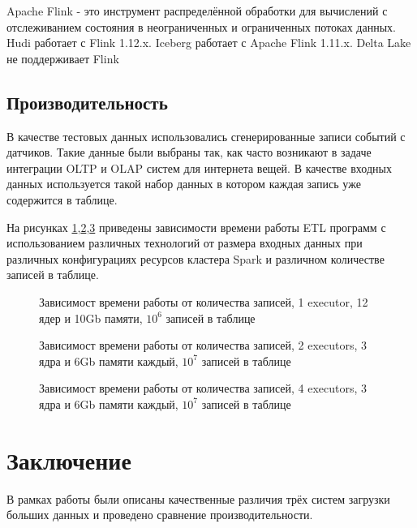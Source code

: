 \documentclass[%
bachelor,    %
subf,        %
href,        %
colorlinks,  %
]{disser}
\begin{document}
Apache Flink - это инструмент распределённой обработки для вычислений с отслеживанием состояния в неограниченных и ограниченных потоках данных.\cite{flink}
Hudi работает с Flink 1.12.x. Iceberg работает с Apache Flink 1.11.x. Delta Lake не поддерживает Flink




\subsection{Производительность}
В качестве тестовых данных использовались сгенерированные записи событий с датчиков. Такие данные были выбраны так, как часто возникают в задаче интеграции OLTP и OLAP систем для интернета вещей.\cite{test_data}\cite{iot_case1}\cite{iot_case2} В качестве входных данных используется такой набор данных в котором каждая запись уже содержится в таблице.

На рисунках \ref{fig:1},\ref{fig:2},\ref{fig:3} приведены зависимости времени работы ETL программ с использованием различных технологий от размера входных данных при различных конфигурациях ресурсов кластера Spark и различном количестве записей в таблице.

\begin{figure}
	
	\caption{Зависимост времени работы от количества записей, 1 executor, 12 ядер и 10Gb памяти, $10^6$ записей в таблице}
	\label{fig:1}
\end{figure}
\begin{figure}
	
	\caption{Зависимост времени работы от количества записей, 2 executors, 3 ядра и 6Gb памяти каждый, $10^7$ записей в таблице}
	\label{fig:2}
\end{figure}
\begin{figure}
	
	\caption{Зависимост времени работы от количества записей, 4 executors, 3 ядра и 6Gb памяти каждый, $10^7$ записей в таблице}
	\label{fig:3}
\end{figure}
\newpage
\section{Заключение}
В рамках работы были описаны качественные различия трёх систем загрузки больших данных и проведено сравнение производительности.
\printbibliography[heading=bibintoc]

\appendix
\end{document}
